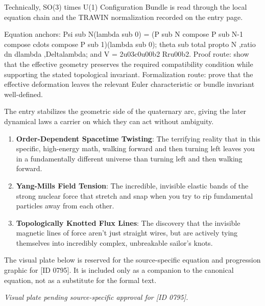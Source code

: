 Technically, SO(3) times U(1) Configuration Bundle is read through the local equation chain and the TRAWIN normalization recorded on the entry page.

Equation anchors: Psi sub N(lambda sub 0) = (P sub N compose P sub N-1 compose cdots compose P sub 1)(lambda sub 0); theta sub total propto N ,ratio dn dlambda ,Deltalambda; and V = 2u03c0u00b2 Rru00b2. Proof route: show that the effective geometry preserves the required compatibility condition while supporting the stated topological invariant. Formalization route: prove that the effective deformation leaves the relevant Euler characteristic or bundle invariant well-defined.

The entry stabilizes the geometric side of the quaternary arc, giving the later dynamical laws a carrier on which they can act without ambiguity.
\endgroup

\begin{enumerate}[leftmargin=1.6em,itemsep=6pt,topsep=4pt]
\item \textbf{Order-Dependent Spacetime Twisting}: The terrifying reality that in this specific, high-energy math, walking forward and then turning left leaves you in a fundamentally different universe than turning left and then walking forward.
\item \textbf{Yang-Mills Field Tension}: The incredible, invisible elastic bands of the strong nuclear force that stretch and snap when you try to rip fundamental particles away from each other.
\item \textbf{Topologically Knotted Flux Lines}: The discovery that the invisible magnetic lines of force aren't just straight wires, but are actively tying themselves into incredibly complex, unbreakable sailor's knots.
\end{enumerate}

\begingroup\footnotesize\sloppy
The visual plate below is reserved for the source-specific equation and progression graphic for [ID 0795]. It is included only as a companion to the canonical equation, not as a substitute for the formal text.
\par\endgroup
\begingroup\footnotesize\itshape
Visual plate pending source-specific approval for [ID 0795].
\par\endgroup

